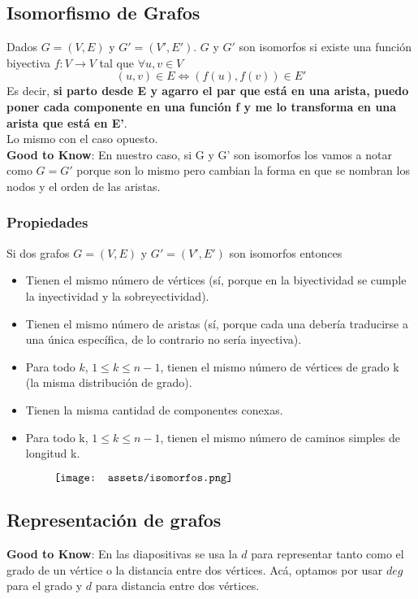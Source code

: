 \documentclass[10pt,a4paper]{article}
\begin{document}
\subsection*{Isomorfismo de Grafos}
Dados  $G = (V, E)$ y $G' = (V', E')$. $G$ y $G'$ son isomorfos si existe una función biyectiva $f: V \rightarrow V$ tal que $\forall u,v \in V$ 
\[(u,v) \in E \iff (f(u), f(v)) \in E'\]
Es decir, \textbf{si parto desde E y agarro el par que está en una arista, puedo poner cada componente en una función f y me lo transforma en una arista que está en E'}. \\
Lo mismo con el caso opuesto. \\
\textbf{Good to Know}: En nuestro caso, si G y G' son isomorfos los vamos a notar como $G = G'$ porque son lo mismo pero cambian la forma en que se nombran los nodos y el orden de las aristas.
\subsubsection*{Propiedades}
Si dos grafos $G = (V,E)$ y $G' = (V', E')$ son isomorfos entonces
\begin{itemize}
    \item Tienen el mismo número de vértices (sí, porque en la biyectividad se cumple la inyectividad y la sobreyectividad).
    \item Tienen el mismo número de aristas (sí, porque cada una debería traducirse a una única específica, de lo contrario no sería inyectiva).
    \item Para todo $k$, $1 \le k \le n-1$, tienen el mismo número de vértices de grado k (la misma distribución de grado).
    \item Tienen la misma cantidad de componentes conexas.
    \item Para todo k, $1 \le k \le n-1$, tienen el mismo número de caminos simples de longitud k.
\end{itemize}
\[\begin{minipage}[b]{0.8\textwidth}
    \texttt{[image: assets/isomorfos.png]}
\end{minipage}\]
\subsection*{Representación de grafos}
\textbf{Good to Know}: En las diapositivas se usa la $d$ para representar tanto como el grado de un vértice o la distancia entre dos vértices. Acá, optamos por usar $deg$ para el grado y $d$ para distancia entre dos vértices.
\end{document}
